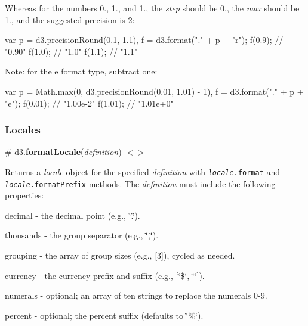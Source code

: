 Whereas for the numbers 0., 1., and 1., the {\itshape step} should be 0., the {\itshape max} should be 1., and the suggested precision is 2\+:


\begin{DoxyCode}
var p = d3.precisionRound(0.1, 1.1),
    f = d3.format("." + p + "r");
f(0.9); // "0.90"
f(1.0); // "1.0"
f(1.1); // "1.1"
\end{DoxyCode}


Note\+: for the {\ttfamily e} format type, subtract one\+:


\begin{DoxyCode}
var p = Math.max(0, d3.precisionRound(0.01, 1.01) - 1),
    f = d3.format("." + p + "e");
f(0.01); // "1.00e-2"
f(1.01); // "1.01e+0"
\end{DoxyCode}


\subsubsection*{Locales}

\label{_formatLocale}%
\# d3.{\bfseries format\+Locale}({\itshape definition}) \href{https://github.com/d3/d3-format/blob/master/src/locale.js}{\tt $<$$>$}

Returns a {\itshape locale} object for the specified {\itshape definition} with \href{#locale_format}{\tt {\itshape locale}.format} and \href{#locale_formatPrefix}{\tt {\itshape locale}.format\+Prefix} methods. The {\itshape definition} must include the following properties\+:


\begin{DoxyItemize}
\item {\ttfamily decimal} -\/ the decimal point (e.\+g., {\ttfamily \char`\"{}.\char`\"{}}).
\item {\ttfamily thousands} -\/ the group separator (e.\+g., {\ttfamily \char`\"{},\char`\"{}}).
\item {\ttfamily grouping} -\/ the array of group sizes (e.\+g., {\ttfamily \mbox{[}3\mbox{]}}), cycled as needed.
\item {\ttfamily currency} -\/ the currency prefix and suffix (e.\+g., {\ttfamily \mbox{[}\char`\"{}\$\char`\"{}, \char`\"{}\char`\"{}\mbox{]}}).
\item {\ttfamily numerals} -\/ optional; an array of ten strings to replace the numerals 0-\/9.
\item {\ttfamily percent} -\/ optional; the percent suffix (defaults to {\ttfamily \char`\"{}\%\char`\"{}}).
\end{DoxyItemize}

